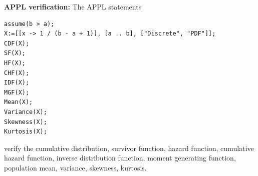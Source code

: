 \documentclass[12pt,fullpage]{article}
\begin{document}
\noindent
{\bf APPL verification:}
The APPL statements
\begin{verbatim}
assume(b > a);
X:=[[x -> 1 / (b - a + 1)], [a .. b], ["Discrete", "PDF"]];
CDF(X);
SF(X);
HF(X);
CHF(X);
IDF(X);
MGF(X);
Mean(X);
Variance(X);
Skewness(X);
Kurtosis(X);
\end{verbatim}
verify the cumulative distribution, survivor function, hazard function, cumulative hazard function, inverse distribution function, moment generating function, population mean, variance, skewness, kurtosis.
\end{document}
